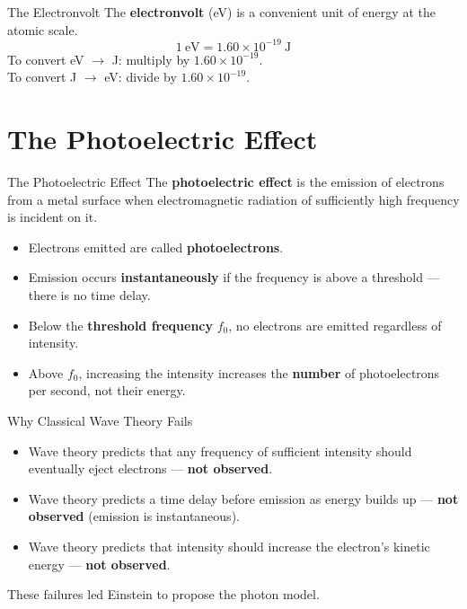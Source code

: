 \begin{keybox}{The Electronvolt}
The \textbf{electronvolt} (eV) is a convenient unit of energy at the atomic scale.
$$1\ \text{eV} = 1.60 \times 10^{-19}\ \text{J}$$
To convert eV $\to$ J: multiply by $1.60\times10^{-19}$.\\
To convert J $\to$ eV: divide by $1.60\times10^{-19}$.
\end{keybox}

\section{The Photoelectric Effect}

\begin{definitionbox}{The Photoelectric Effect}
The \textbf{photoelectric effect} is the emission of electrons from a metal surface when electromagnetic radiation of sufficiently high frequency is incident on it.
\begin{itemize}[itemsep=2pt]
  \item Electrons emitted are called \textbf{photoelectrons}.
  \item Emission occurs \textbf{instantaneously} if the frequency is above a threshold — there is no time delay.
  \item Below the \textbf{threshold frequency} $f_0$, no electrons are emitted regardless of intensity.
  \item Above $f_0$, increasing the intensity increases the \textbf{number} of photoelectrons per second, not their energy.
\end{itemize}
\end{definitionbox}

\begin{warningbox}{Why Classical Wave Theory Fails}
\begin{itemize}[itemsep=3pt]
  \item Wave theory predicts that any frequency of sufficient intensity should eventually eject electrons — \textbf{not observed}.
  \item Wave theory predicts a time delay before emission as energy builds up — \textbf{not observed} (emission is instantaneous).
  \item Wave theory predicts that intensity should increase the electron's kinetic energy — \textbf{not observed}.
\end{itemize}
These failures led Einstein to propose the photon model.
\end{warningbox}

